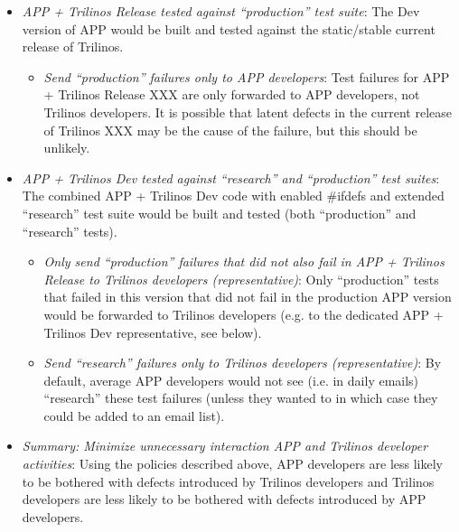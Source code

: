 \documentclass[pdf,ps2pdf,11pt]{SANDreport}
\begin{document}
  \begin{itemize}

  {}\item\textit{APP + Trilinos Release tested against ``production'' test
  suite}: The Dev version of APP would be built and tested against the
  static/stable current release of Trilinos.

    \begin{itemize}

    {}\item\textit{Send ``production'' failures only to APP developers}: Test
    failures for APP + Trilinos Release XXX are only forwarded to APP
    developers, not Trilinos developers.  It is possible that latent defects
    in the current release of Trilinos XXX may be the cause of the failure,
    but this should be unlikely.

    \end{itemize}

  {}\item\textit{APP + Trilinos Dev tested against ``research'' and
  ``production'' test suites}: The combined APP + Trilinos Dev code with
  enabled {}\#ifdefs and extended ``research'' test suite would be built and
  tested (both ``production'' and ``research'' tests).

    \begin{itemize}

    {}\item\textit{Only send ``production'' failures that did not also fail in
    APP + Trilinos Release to Trilinos developers (representative)}: Only
    ``production'' tests that failed in this version that did not fail in the
    production APP version would be forwarded to Trilinos developers (e.g. to
    the dedicated APP + Trilinos Dev representative, see below).

    {}\item\textit{Send ``research'' failures only to Trilinos developers
    (representative)}: By default, average APP developers would not see
    (i.e. in daily emails) ``research'' these test failures (unless they
    wanted to in which case they could be added to an email list).

    \end{itemize}

  {}\item\textit{Summary: Minimize unnecessary interaction APP and Trilinos
  developer activities}: Using the policies described above, APP developers
  are less likely to be bothered with defects introduced by Trilinos
  developers and Trilinos developers are less likely to be bothered with
  defects introduced by APP developers.

  \end{itemize}
\end{document}
